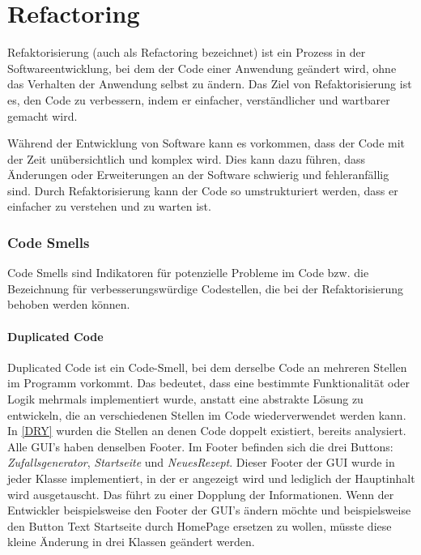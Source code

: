 \chapter{Refactoring}
Refaktorisierung (auch als Refactoring bezeichnet) ist ein Prozess in der Softwareentwicklung, bei dem der Code einer Anwendung geändert wird, ohne das Verhalten der Anwendung selbst zu ändern. Das Ziel von Refaktorisierung ist es, den Code zu verbessern, indem er einfacher, verständlicher und wartbarer gemacht wird.

Während der Entwicklung von Software kann es vorkommen, dass der Code mit der Zeit unübersichtlich und komplex wird. Dies kann dazu führen, dass Änderungen oder Erweiterungen an der Software schwierig und fehleranfällig sind. Durch Refaktorisierung kann der Code so umstrukturiert werden, dass er einfacher zu verstehen und zu warten ist.
\subsection{Code Smells}
Code Smells sind Indikatoren für potenzielle Probleme im Code bzw. die Bezeichnung für verbesserungswürdige Codestellen, die bei der Refaktorisierung behoben werden können. 
\subsubsection{Duplicated Code}
Duplicated Code ist ein Code-Smell, bei dem derselbe Code an mehreren Stellen im Programm vorkommt. Das bedeutet, dass eine bestimmte Funktionalität oder Logik mehrmals implementiert wurde, anstatt eine abstrakte Lösung zu entwickeln, die an verschiedenen Stellen im Code wiederverwendet werden kann. In \autoref{DRY} wurden die Stellen an denen Code doppelt existiert, bereits analysiert. Alle GUI's haben denselben Footer. Im Footer befinden sich die drei Buttons: \emph{Zufallsgenerator}, \emph{Startseite} und \emph{NeuesRezept}. Dieser Footer der GUI wurde in jeder Klasse implementiert, in der er angezeigt wird und lediglich der Hauptinhalt wird ausgetauscht. Das führt zu einer Dopplung der Informationen. Wenn der Entwickler beispielsweise den Footer der GUI's ändern möchte und beispielsweise den Button Text Startseite durch HomePage ersetzen zu wollen, müsste diese kleine Änderung in drei Klassen geändert werden. 

